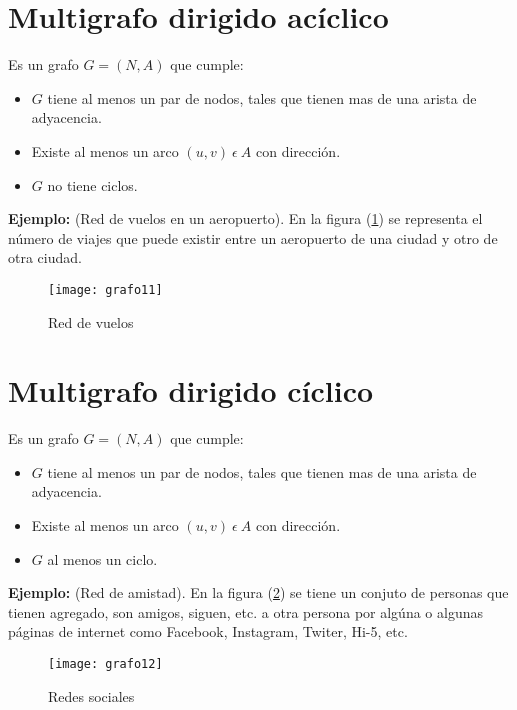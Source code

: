 \documentclass[a4paper, 11pt]{article}
\begin{document}

\section*{Multigrafo dirigido acíclico }


Es un grafo $G = (N, A)$ que cumple:
\begin{itemize}
\item $G$ tiene al menos un par de nodos, tales que tienen mas de una arista de adyacencia.
\item Existe al menos un arco $(u, v) \ \epsilon \ A$ con dirección.
\item $G$ no tiene ciclos.
\end{itemize}


\textbf{Ejemplo:} (Red de vuelos en un aeropuerto). En la figura (\ref{imagen11}) se representa el número de viajes que puede existir entre un aeropuerto de una ciudad y otro de otra ciudad.

\begin{figure}[H]
  \centering
    \texttt{[image: grafo11]}
  \caption{Red de vuelos}
  \label{imagen11}
\end{figure}




\section*{Multigrafo dirigido cíclico }

Es un grafo $G = (N, A)$ que cumple:
\begin{itemize}
\item $G$ tiene al menos un par de nodos, tales que tienen mas de una arista de adyacencia.
\item Existe al menos un arco $(u, v) \ \epsilon \ A$ con dirección.
\item $G$ al menos un ciclo.
\end{itemize}


\textbf{Ejemplo:} (Red de amistad). En la figura (\ref{imagen12}) se tiene un conjuto de personas que tienen agregado, son amigos, siguen, etc. a otra persona por algúna o algunas páginas de internet como Facebook, Instagram, Twiter, Hi-5, etc.

\begin{figure}[H]
  \centering
    \texttt{[image: grafo12]}
  \caption{Redes sociales}
  \label{imagen12}
\end{figure}
\end{document}
